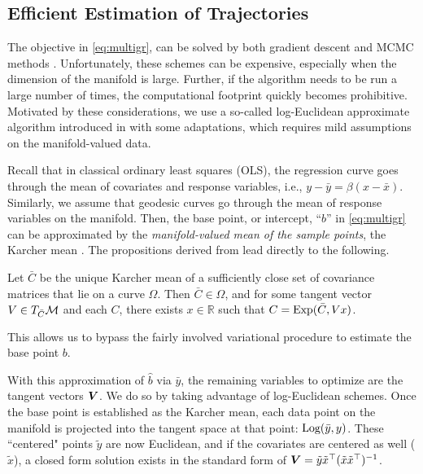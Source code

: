 \subsection{Efficient Estimation of Trajectories}
\label{sec:effest}
The objective in \eqref{eq:multigr}, can be solved by both gradient descent \cite{fletcher2013geodesic,hjkimcvpr2014} and MCMC methods \cite{cornea2016regression}. 
Unfortunately, these schemes can be expensive, especially when the dimension of the manifold is large. Further, if the algorithm needs to be run a 
large number of times, the computational footprint quickly becomes prohibitive. 
Motivated by these considerations, we use a so-called log-Euclidean approximate algorithm introduced in \cite{hjkimcvpr2014} with some adaptations, which requires mild assumptions on the manifold-valued data. 

Recall that in classical ordinary least squares (OLS), 
the regression curve goes through the mean of covariates and response variables, i.e., $y-\bar{y} = \beta(x-\bar{x})$.
Similarly, we assume that geodesic curves go through the mean of response variables on the manifold. Then, the base point, or intercept, ``$b$'' in \eqref{eq:multigr} can be approximated by the {\em manifold-valued mean of the sample points}, the Karcher mean \cite{karcher1977riemannian}. The propositions derived from \cite{hjkimcvpr2014} lead directly to the following. 
\begin{proposition}
Let $\bar{C}$ be the unique Karcher mean of a sufficiently close set of covariance matrices that lie on a curve $\Omega$. Then $\bar{C} \in \Omega$, and for some tangent vector $V \in T_{\bar{C}}\mathcal{M}$ and each $C$, there exists $x \in \mathbb{R}$ such that $C = \text{Exp}(\bar{C},Vx)$. 	
\end{proposition}
This allows us to bypass the fairly involved variational procedure to estimate the base point $b$.

With this approximation of $\hat{b}$ via $\bar{y}$, the remaining variables to optimize are the tangent vectors $\bm{V}$. 
We do so by taking advantage of log-Euclidean schemes. Once the base point is established as the Karcher mean, each data point on the manifold is projected into the tangent space at that point: $\text{Log}(\bar{y},y)$. These ``centered" points $\tilde{y}$ are now Euclidean, and if the covariates are centered as well ($\tilde{x}$), a closed form solution exists in the standard form of $\bm{V} = \tilde{y}\tilde{x}^\top (\tilde{x}\tilde{x}^\top)^{-1}$. 

